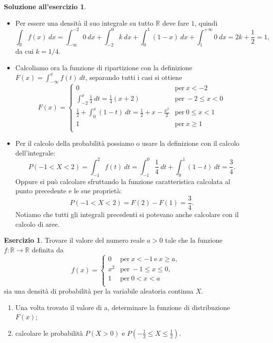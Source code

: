 \documentclass[12pt,a4paper]{article}
\theoremstyle{definition}
\newtheorem{sol}{Soluzione all'esercizio}
\newtheorem{exe}{Esercizio}
\newcommand{\numberset}{\mathbb}
\newcommand{\R}{\numberset{R}}
\begin{document}
\begin{sol}\mbox{}\vspace{-0.7cm}\\
	\begin{itemize}
		\item  Per essere una densità il suo integrale su tutto $ \mathbb{R} $ deve fare $ 1 $, quindi
		      \[ \int_{\mathbb{R}} f(x) \ dx = \int_{-\infty}^{-2}0 \ dx + \int_{-2}^{0}k \ dx + \int_{0}^{1}(1-x)\ dx + \int_{1}^{+\infty} 0 \ dx = 2k + \frac12 = 1, \]
		      da cui $ k = 1/4. $
		\item Calcoliamo ora la funzione di ripartizione con la definizione $ F(x) = \int_{-\infty}^{x} f(t) \ dt $, separando tutti i casi si ottiene
		      \[ F(x) = \begin{cases}
				      0                                                             & \text{per} \ x < -2       \\
				      \int_{-2}^{x}\frac14 \ dt = \frac14(x+2)                      & \text{per} \ -2 \le x < 0 \\
				      \frac12 + \int_{0}^{x} (1-t)\ dt = \frac12 + x -\frac{x^2}{2} & \text{per} \ 0 \le x < 1  \\
				      1                                                             & \text{per} \ x \ge 1      \\
			      \end{cases} \]
		\item Per il calcolo della probabilità possiamo o usare la definizione con il calcolo dell'integrale:
		      \[ P(-1 < X < 2) = \int_{-1}^{2}f(t) \ dt = \int_{-1}^{0} \frac{1}{4} \ dt + \int_{0}^{1}(1-t) \ dt = \frac{3}{4}.\]
		      Oppure si può calcolare sfruttando la funzione caratteristica calcolata al punto precedente e le sue proprietà:
		      \[ P(-1 < X < 2) = F(2) - F(1) = \frac34 . \]
		      Notiamo che tutti gli integrali precedenti si potevano anche calcolare con il calcolo di aree.
	\end{itemize}
\end{sol}

\begin{exe}
	Trovare il valore del numero reale $ a > 0 $ tale che la funzione $ f : \R \to \R $ definita da
	\[ f(x) = \begin{cases}
			0   & \mbox{per} \ x < -1 \ \mbox{e} \ x \ge a, \\
			x^2 & \mbox{per} \ -1\le x \le 0,               \\
			1   & \mbox{per} \ 0 < x < a                    \\
		\end{cases} \]
	sia una densità di probabilità per la variabile aleatoria continua $ X $.
	\begin{enumerate}
		\item Una volta trovato il valore di a, determinare la funzione di distribuzione $ F(x) $;
		\item calcolare le probabilità $ P(X > 0)$ e $ P \left(-\frac{1}{2} \le X \le \frac{1}{2} \right)  $.
	\end{enumerate}
\end{exe}
\end{document}
